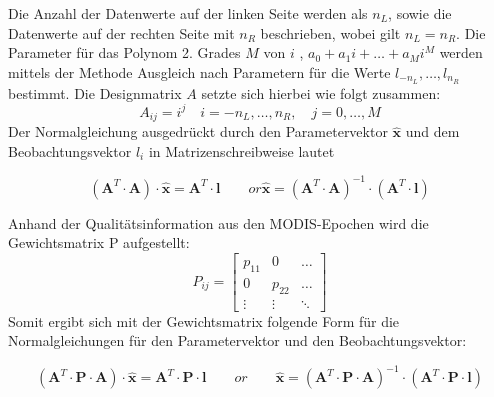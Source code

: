 \documentclass[11pt]{report}
\begin{document}
Die Anzahl der Datenwerte auf der linken Seite werden als $n_L$, sowie die Datenwerte auf der rechten Seite mit $n_R$ beschrieben, wobei gilt $n_L = n_R$.
Die Parameter für das Polynom 2. Grades $M$ von $i$ , $a_0+a_1i+\dots+a_Mi^M$ werden mittels der Methode Ausgleich nach Parametern für die Werte $l_{-n_L},\dots,l_{n_R}$ bestimmt. Die Designmatrix $A$ setzte sich hierbei wie folgt zusammen:
\begin{equation}
A_{ij} = i^j\quad i = -n_L, \dots, n_R,\quad j =0,\dots,M
\end{equation}
Der Normalgleichung ausgedrückt durch den Parametervektor $\widehat{\textbf{x}}$ und dem Beobachtungsvektor \textbf{$l_i$} in Matrizenschreibweise lautet

\begin{equation}
\left(\textbf{A}^T\cdot\textbf{A}\right)\cdot\widehat{\textbf{x}}=\textbf{A}^T\cdot\textbf{l}\qquad or  \widehat{\textbf{x}}=\left(\textbf{A}^T\cdot\textbf{A}\right)^{-1}\cdot\left(\textbf{A}^T\cdot\textbf{l}\right)
\end{equation}\newline


Anhand der Qualitätsinformation aus den MODIS-Epochen wird die Gewichtsmatrix P aufgestellt:
\begin{equation}
P_{ij} = \left[ \begin{array}{cccc} p_{11} & 0 & \ldots \\0 & p_{22} & \ldots \\ \vdots & \vdots & \ddots \end{array} \right]
\end{equation}\newline
Somit ergibt sich mit der Gewichtsmatrix folgende Form für die Normalgleichungen für den Parametervektor und den Beobachtungsvektor:

\begin{equation}
\left(\textbf{A}^T\cdot\textbf{P}\cdot\textbf{A}\right)\cdot\widehat{\textbf{x}}=\textbf{A}^T\cdot\textbf{P}\cdot\textbf{l}\qquad or \qquad \widehat{\textbf{x}}=\left(\textbf{A}^T\cdot\textbf{P}\cdot\textbf{A}\right)^{-1}\cdot\left(\textbf{A}^T\cdot\textbf{P}\cdot\textbf{l}\right)
\end{equation}\newline
\end{document}
